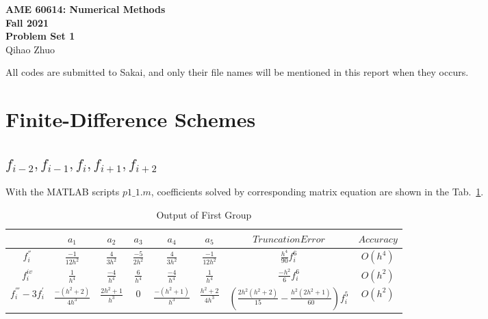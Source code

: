 \documentclass[letterpaper,10pt]{article}
\begin{document}
\fancyhf{}
\fancyfoot[C]{\thepage}

\thispagestyle{plain}
\begin{center}
  \large
  \textbf{AME 60614: Numerical Methods} \\
  \textbf{Fall 2021} \\
  \vspace{0.5em}
  \textbf{Problem Set 1} \\
  \vspace{1em}
  Qihao Zhuo
\end{center}

\vspace{1.5em}

All codes are submitted to Sakai, and only their file names will be mentioned in this report when they occurs. 
\section{Finite-Difference Schemes}\label{sec1}
\subsection{$f_{i-2},f_{i-1},f_{i},f_{i+1},f_{i+2}$}
With the MATLAB scripts $p1\_1.m$, coefficients solved by corresponding matrix equation are shown in the Tab.~\ref{tab1_1}.  
\begin{table}[htbp]
  \centering  
  \caption{Output of First Group}\label{tab1_1}
  \begin{tabular}{cccccccc}
    \hline
    & $a_1$ & $a_2$ & $a_3$ & $a_4$& $a_5$ & $Truncation Error$& $Accuracy$\\
    \hline
    $f_{i}^{''}$ & $\frac{-1}{12h^2}$ & $\frac{4}{3h^2}$ & $\frac{-5}{2h^2}$ & $\frac{4}{3h^2}$ & $\frac{-1}{12h^2}$ & $\frac{h^4}{90}f_{i}^{6}$& $O\left(h^4\right)$\\
    $f_{i}^{iv}$ & $\frac{1}{h^4}$ & $\frac{-4}{h^4}$ & $\frac{6}{h^4}$ & $\frac{-4}{h^4}$ & $\frac{1}{h^4}$ & $\frac{-h^2}{6}f_{i}^{6}$& $O\left(h^2\right)$\\
    $f_{i}^{'''}-3f_{i}^{'}$ & $\frac{-\left(h^2+2\right)}{4h^3}$ & $\frac{2h^2+1}{h^3}$ & 0 & $\frac{-\left(h^2+1\right)}{h^3}$ & $\frac{h^2+2}{4h^3}$ & $\left(\frac{2h^2(h^2 + 2)}{15} - \frac{h^2(2h^2 + 1)}{60}\right)f_{i}^{5}$&$O\left(h^2\right)$\\
    \hline
  \end{tabular}
\end{table}
\end{document}
